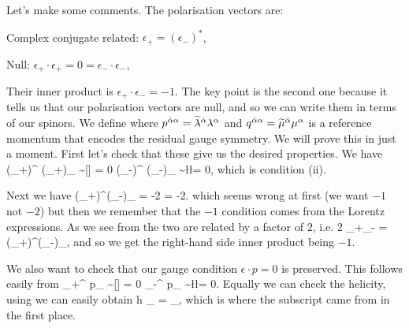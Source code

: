Let's make some comments. The polarisation vectors are:
\ben[label=(\roman*)] 
    \item Complex conjugate related: $\epsilon_+= (\epsilon_-)^*$,
    \item Null: $\epsilon_+\cdot\epsilon_+ = 0 = \epsilon_-\cdot\epsilon_-$,
    \item Their inner product is $\epsilon_+\cdot \epsilon_- = -1$.
\een 
The key point is the second one because it tells us that our polarisation vectors are null, and so we can write them in terms of our spinors. We define
\noindent where $p^{\dot{\alpha}\alpha} = \widetilde{\lambda}^{\dot{\alpha}} \lambda^{\alpha}$ and $q^{\dot{\alpha}\alpha} = \widetilde{\mu}^{\dot{\alpha}}\mu^{\alpha}$ is a reference momentum that encodes the residual gauge symmetry. We will prove this in just a moment. First let's check that these give us the desired properties. We have 
\bse 
    (\epsilon_+)^{\dot{\a}\a} (\epsilon_+)_{\a\dot{\a}} \sim [\widetilde{\l}\widetilde{\l}] = 0 \qand (\epsilon_-)^{\dot{\a}\a} (\epsilon_-)_{\a\dot{\a}}  \sim \la \l \l \ra = 0,
\ese
which is condition (ii). 

Next we have
\bse 
    (\epsilon_+)^{\dot{\a}\a}(\epsilon_-)_{\a\dot{\a}} = -2 \frac{[\widetilde{\mu}\widetilde{\l}]\la \mu\l\ra }{\la \l \mu \ra [\widetilde{\l}\widetilde{\mu}]} = -2.
\ese 
which seems wrong at first (we want $-1$ not $-2$) but then we remember that the $-1$ condition comes from the Lorentz expressions. As we see from  the two are related by a factor of $2$, i.e.
\be
\label{eqn:LorentzToSpinorContraction}
    2 \epsilon_+\cdot\epsilon_- = (\epsilon_+)^{\dot{\a}\a}(\epsilon_-)_{\a\dot{\a}},
\ee 
and so we get the right-hand side inner product being $-1$. 

We also want to check that our gauge condition $\epsilon\cdot p =0$ is preserved. This follows easily from 
\bse
    \epsilon_+^{\dot{\a}\a} p_{\dot{\a}\a} \sim [\widetilde{\l}\widetilde{\l}] = 0 \qand \epsilon_-^{\dot{\a}\a} p_{\dot{\a}\a} \sim \la \l \l \ra = 0.
\ese 
Equally we can check the helicity, using  we can easily obtain
\bse 
    h \epsilon_{\pm} = \pm \epsilon_{\pm},
\ese 
which is where the subscript came from in the first place. 

